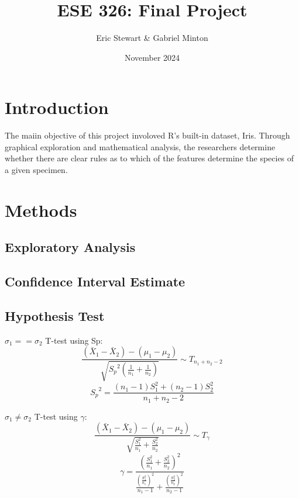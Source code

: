 \documentclass{article}
\title{ESE 326: Final Project}
\author{Eric Stewart \& Gabriel Minton}
\date{November 2024}
\begin{document}
\maketitle

\section{Introduction}
The maiin objective of this project involoved R's built-in dataset, Iris. Through graphical exploration and mathematical analysis, the researchers determine
whether there are clear rules as to which of the features determine the species of a given specimen.


\color{Aquamarine}


\section{Methods}

\subsection{Exploratory Analysis}


\subsection{Confidence Interval Estimate}



\subsection{Hypothesis Test}

$\sigma_1 == \sigma_2$ T-test using Sp:
\begin{equation}
	\frac{(\bar{X}_1 - \bar{X}_2) - (\mu_1 - \mu_2)}{\sqrt{{S_p}^2 \left(\frac{1}{n_1} + \frac{1}{n_2} \right)}} \sim T_{n_1 + n_2 -2}
	\label{eq:t-test_equal}
\end{equation}
\begin{equation}
	{S_p}^2 = \frac{(n_1 - 1) S_1^2 + (n_2 -1) S_2^2}{n_1 + n_2 -2}
	\label{eq:pool_sample_variance}
\end{equation}

$\sigma_1 \neq \sigma_2$ T-test using $\gamma$:
\begin{equation}
	\frac{(\bar{X}_1 - \bar{X}_2) - (\mu_1 - \mu_2)}{\sqrt{\frac{S_1^2}{n_1} + \frac{S_2^2}{n_2}}} \sim T_\gamma
	\label{eq:t-test_unequal}
\end{equation}
\begin{equation}
	\gamma = \frac{\left(\frac{S_1^2}{n_1} + \frac{S_2^2}{n_2} \right)^2}{\frac{\left(\frac{S_1^2}{n_1} \right)^2}{n_1 - 1} + \frac{\left(\frac{S_2^2}{n_2} \right)^2}{n_2 - 1}}
	\label{eq:gamma_unequal}
\end{equation}
\end{document}
